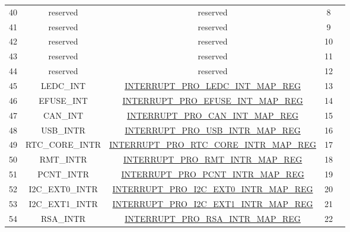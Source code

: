\begin{footnotesize}
\begin{longtable}[c]{|*{5}{c|}}
  40  & reserved & reserved &8  &                          	\\
    \cline{1-4}
    41  & reserved &reserved  &9  &                          	\\
    \cline{1-4}
    42  & reserved &reserved  &10  &                          	\\
    \cline{1-4}
    43  & reserved &reserved  &11  &                          	\\
    \cline{1-4}
    44   & reserved &reserved  &12  &                          	\\
    \cline{1-4}
    45   & LEDC\_INT &\hyperref[regdesc:INTERRUPTPROLEDCINTMAPREG]{INTERRUPT\_PRO\_LEDC\_INT\_MAP\_REG}  &13  &                          	\\
    \cline{1-4}
    46   & EFUSE\_INT &\hyperref[regdesc:INTERRUPTPROEFUSEINTMAPREG]{INTERRUPT\_PRO\_EFUSE\_INT\_MAP\_REG}  &14  &                          	\\
    \cline{1-4}
    47   & CAN\_INT &\hyperref[regdesc:INTERRUPTPROCANINTMAPREG]{INTERRUPT\_PRO\_CAN\_INT\_MAP\_REG}  &15  &                          	\\
    \cline{1-4}
    48   & USB\_INTR &\hyperref[regdesc:INTERRUPTPROUSBINTRMAPREG]{INTERRUPT\_PRO\_USB\_INTR\_MAP\_REG}  &16  &                          	\\
    \cline{1-4}
    49   & RTC\_CORE\_INTR &\hyperref[regdesc:INTERRUPTPRORTCCOREINTRMAPREG]{INTERRUPT\_PRO\_RTC\_CORE\_INTR\_MAP\_REG}  &17  &                          	\\
    \cline{1-4}
    50   & RMT\_INTR &\hyperref[regdesc:INTERRUPTPRORMTINTRMAPREG]{INTERRUPT\_PRO\_RMT\_INTR\_MAP\_REG}  &18  &                          	\\
    \cline{1-4}
    51   & PCNT\_INTR &\hyperref[regdesc:INTERRUPTPROPCNTINTRMAPREG]{INTERRUPT\_PRO\_PCNT\_INTR\_MAP\_REG}  &19  &                          	\\
    \cline{1-4}
    52   & I2C\_EXT0\_INTR &\hyperref[regdesc:INTERRUPTPROI2CEXT0INTRMAPREG]{INTERRUPT\_PRO\_I2C\_EXT0\_INTR\_MAP\_REG}  &20  &                          	\\
    \cline{1-4}
    53   & I2C\_EXT1\_INTR &\hyperref[regdesc:INTERRUPTPROI2CEXT1INTRMAPREG]{INTERRUPT\_PRO\_I2C\_EXT1\_INTR\_MAP\_REG}  &21  &                          	\\
    \cline{1-4}
    54   & RSA\_INTR &\hyperref[regdesc:INTERRUPTPRORSAINTRMAPREG]{INTERRUPT\_PRO\_RSA\_INTR\_MAP\_REG}  &22  &                          	\\

\end{longtable}
\end{footnotesize}
